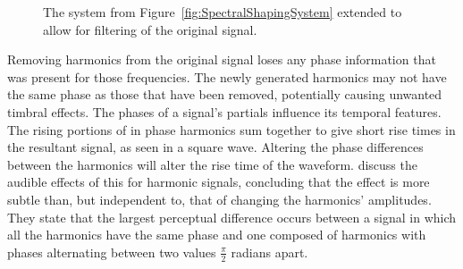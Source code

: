 \begin{figure}[h!]
			\caption{The system from Figure~\ref{fig:SpectralShapingSystem} extended to allow for filtering of
				 the original signal.}
			\label{fig:SuperpositionSystem}
		\end{figure}

		Removing harmonics from the original signal loses any phase information that was present for those
		frequencies. The newly generated harmonics may not have the same phase as those that have been removed,
		potentially causing unwanted timbral effects. The phases of a signal's partials influence its temporal
		features. The rising portions of in phase harmonics sum together to give short rise times in the resultant
		signal, as seen in a square wave. Altering the phase differences between the harmonics will alter the rise
		time of the waveform. \citet{plomp1969effect} discuss the audible effects of this for harmonic signals,
		concluding that the effect is more subtle than, but independent to, that of changing the harmonics'
		amplitudes. They state that the largest perceptual difference occurs between a signal in which all the
		harmonics have the same phase and one composed of harmonics with phases alternating between two values
		$\frac{\pi}{2}$ radians apart.


